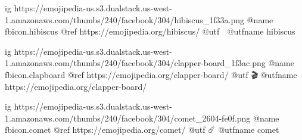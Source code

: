 	ig https://emojipedia-us.s3.dualstack.us-west-1.amazonaws.com/thumbs/240/facebook/304/hibiscus_1f33a.png
	@name fbicon.hibiscus
	@ref https://emojipedia.org/hibiscus/
	@utf 🌺
	@utfname hibiscus

	ig https://emojipedia-us.s3.dualstack.us-west-1.amazonaws.com/thumbs/240/facebook/304/clapper-board_1f3ac.png
	@name fbicon.clapboard
	@ref https://emojipedia.org/clapper-board/
	@utf 🎬
	@utfname https://emojipedia.org/clapper-board/

	ig https://emojipedia-us.s3.dualstack.us-west-1.amazonaws.com/thumbs/240/facebook/304/comet_2604-fe0f.png
	@name fbicon.comet
	@ref https://emojipedia.org/comet/
	@utf ☄️
	@utfname comet

\fi

